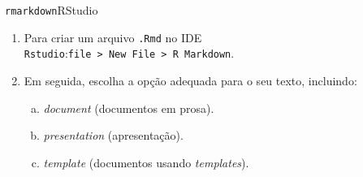 \documentclass[
  10pt,
  ignorenonframetext,
]{beamer}
\providecommand{\tightlist}{%
  \setlength{\itemsep}{0pt}\setlength{\parskip}{0pt}}\usepackage{longtable,booktabs,array}
\begin{document}
\begin{frame}[fragile]{\texttt{rmarkdown}\newline RStudio}
\protect\hypertarget{rmarkdownrstudio}{}
\begin{enumerate}
\tightlist
\item
  Para criar um arquivo \texttt{.Rmd} no IDE
  \texttt{Rstudio}:\newline \texttt{file\ \textgreater{}\ New\ File\ \textgreater{}\ R\ Markdown}.
\item
  Em seguida, escolha a opção adequada para o seu texto, incluindo:

  \begin{enumerate}
  [a.]
  \tightlist
  \item
    \emph{document} (documentos em prosa).
  \item
    \emph{presentation} (apresentação).
  \item
    \emph{template} (documentos usando \emph{templates}).
  \end{enumerate}
\end{enumerate}
\end{frame}
\end{document}
